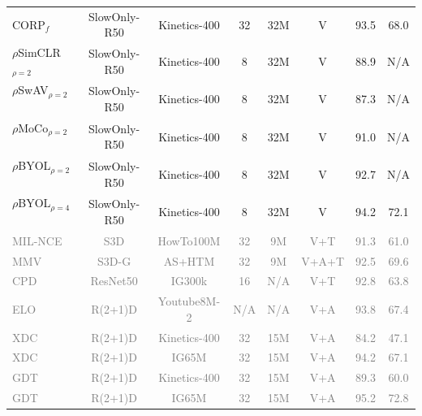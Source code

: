 \documentclass{article}
\begin{document}
\begin{table}[t!]
\begin{tabular}{l|c|c|c|c|c|c|c}
	CORP$_{f}$~\cite{Hu_2021_ICCV}& SlowOnly-R50  & Kinetics-400  &  32 & 32M   & V & 93.5 & 68.0  \\ 
	$\rho$SimCLR$_{\rho=2}$~\cite{large}   & SlowOnly-R50 & Kinetics-400 & 8 & 32M   &V  & 88.9 & N/A  \\
	$\rho$SwAV$_{\rho=2}$~\cite{large}  & SlowOnly-R50  & Kinetics-400 & 8  & 32M  &V   & 87.3 & N/A  \\
	$\rho$MoCo$_{\rho=2}$~\cite{large} & SlowOnly-R50 & Kinetics-400  & 8 & 32M  &V  & 91.0 & N/A  \\
	$\rho$BYOL$_{\rho=2}$~\cite{large} & SlowOnly-R50 & Kinetics-400 & 8  & 32M  &V & 92.7 & N/A \\
	$\rho$BYOL$_{\rho=4}$~\cite{large}  & SlowOnly-R50 & Kinetics-400 & 8  & 32M & V & 94.2 & 72.1  \\
	\hline 
	\textcolor{gray}{MIL-NCE~\cite{milnce}}  & \textcolor{gray}{S3D} & \textcolor{gray}{HowTo100M} & \textcolor{gray}{32} & \textcolor{gray}{9M}   & \textcolor{gray}{V+T} & \textcolor{gray}{91.3} & \textcolor{gray}{61.0} \\
	\textcolor{gray}{MMV~\cite{mmv}}& \textcolor{gray}{S3D-G} & \textcolor{gray}{AS+HTM}  & \textcolor{gray}{32}   & \textcolor{gray}{9M}   & {\textcolor{gray}{ V+A+T}} & \textcolor{gray}{92.5} & \textcolor{gray}{69.6} \\
	\textcolor{gray}{CPD~\cite{cpd}}  & \textcolor{gray}{ResNet50}& \textcolor{gray}{IG300k} & \textcolor{gray}{16} & \textcolor{gray}{N/A} & \textcolor{gray}{V+T} & \textcolor{gray}{92.8} & \textcolor{gray}{63.8}  \\
    \textcolor{gray}{ELO~\cite{elo}}  & \textcolor{gray}{R(2+1)D} & \textcolor{gray}{Youtube8M-2} & \textcolor{gray}{N/A} &  \textcolor{gray}{N/A}  & \textcolor{gray}{V+A}  & \textcolor{gray}{93.8} & \textcolor{gray}{67.4}   \\
	\textcolor{gray}{XDC~\cite{xdc}}  & \textcolor{gray}{R(2+1)D} & \textcolor{gray}{Kinetics-400}  & \textcolor{gray}{32}  & \textcolor{gray}{15M} &  \textcolor{gray}{V+A} & \textcolor{gray}{84.2}  & \textcolor{gray}{47.1} \\ 
	\textcolor{gray}{XDC~\cite{xdc}}  & \textcolor{gray}{R(2+1)D} & \textcolor{gray}{IG65M}  & \textcolor{gray}{32}  & \textcolor{gray}{15M} &  \textcolor{gray}{V+A} & \textcolor{gray}{94.2}  & \textcolor{gray}{67.1} \\ 
	\textcolor{gray}{GDT~\cite{gdt}}  & \textcolor{gray}{R(2+1)D}& \textcolor{gray}{Kinetics-400} & \textcolor{gray}{32} & \textcolor{gray}{15M} & \textcolor{gray}{V+A} & \textcolor{gray}{89.3} & \textcolor{gray}{60.0}  \\
	\textcolor{gray}{GDT~\cite{gdt}}  & \textcolor{gray}{R(2+1)D}& \textcolor{gray}{IG65M} & \textcolor{gray}{32} & \textcolor{gray}{15M} & \textcolor{gray}{V+A} & \textcolor{gray}{95.2} & \textcolor{gray}{72.8}  \\
	

\end{tabular}
\end{table}
\end{document}
